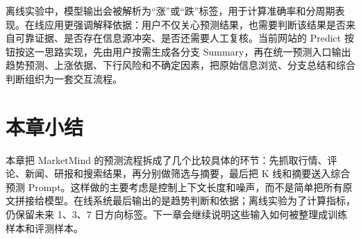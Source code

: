 离线实验中，模型输出会被解析为“涨”或“跌”标签，用于计算准确率和分周期表现。在线应用更强调解释依据：用户不仅关心预测结果，也需要判断该结果是否来自可靠证据、是否存在信息源冲突、是否还需要人工复核。当前网站的 Predict 按钮按这一思路实现，先由用户按需生成各分支 Summary，再在统一预测入口输出趋势预测、上涨依据、下行风险和不确定因素，把原始信息浏览、分支总结和综合判断组织为一套交互流程。

\section{本章小结}

本章把 MarketMind 的预测流程拆成了几个比较具体的环节：先抓取行情、评论、新闻、研报和搜索结果，再分别做筛选与摘要，最后把 K 线和摘要送入综合预测 Prompt。这样做的主要考虑是控制上下文长度和噪声，而不是简单把所有原文拼接给模型。在线系统最后输出的是趋势判断和依据；离线实验为了计算指标，仍保留未来 1、3、7 日方向标签。下一章会继续说明这些输入如何被整理成训练样本和评测样本。
